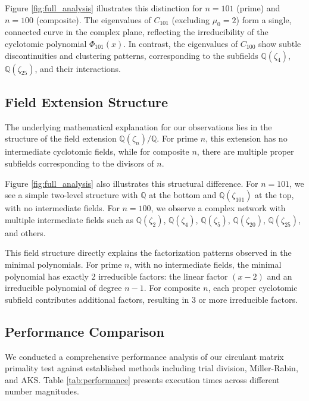 Figure \ref{fig:full_analysis} illustrates this distinction for $n=101$ (prime) and $n=100$ (composite). The eigenvalues of $C_{101}$ (excluding $\mu_0 = 2$) form a single, connected curve in the complex plane, reflecting the irreducibility of the cyclotomic polynomial $\Phi_{101}(x)$. In contrast, the eigenvalues of $C_{100}$ show subtle discontinuities and clustering patterns, corresponding to the subfields $\mathbb{Q}(\zeta_4)$, $\mathbb{Q}(\zeta_{25})$, and their interactions.

\subsection{Field Extension Structure}

The underlying mathematical explanation for our observations lies in the structure of the field extension $\mathbb{Q}(\zeta_n)/\mathbb{Q}$. For prime $n$, this extension has no intermediate cyclotomic fields, while for composite $n$, there are multiple proper subfields corresponding to the divisors of $n$.

Figure \ref{fig:full_analysis} also illustrates this structural difference. For $n=101$, we see a simple two-level structure with $\mathbb{Q}$ at the bottom and $\mathbb{Q}(\zeta_{101})$ at the top, with no intermediate fields. For $n=100$, we observe a complex network with multiple intermediate fields such as $\mathbb{Q}(\zeta_2)$, $\mathbb{Q}(\zeta_4)$, $\mathbb{Q}(\zeta_5)$, $\mathbb{Q}(\zeta_{20})$, $\mathbb{Q}(\zeta_{25})$, and others.

This field structure directly explains the factorization patterns observed in the minimal polynomials. For prime $n$, with no intermediate fields, the minimal polynomial has exactly 2 irreducible factors: the linear factor $(x-2)$ and an irreducible polynomial of degree $n-1$. For composite $n$, each proper cyclotomic subfield contributes additional factors, resulting in 3 or more irreducible factors.

\subsection{Performance Comparison}

We conducted a comprehensive performance analysis of our circulant matrix primality test against established methods including trial division, Miller-Rabin, and AKS. Table \ref{tab:performance} presents execution times across different number magnitudes.

